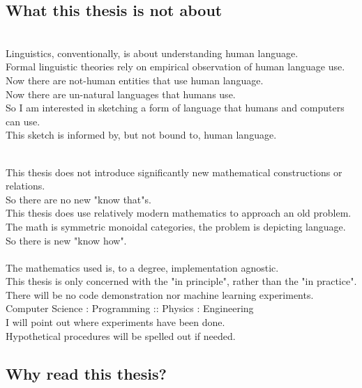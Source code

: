 \begin{fullwidth}
\begin{centering}
\subsection{What this thesis is not about}

\\
Linguistics, conventionally, is about understanding human language.\\
Formal linguistic theories rely on empirical observation of human language use.\\
Now there are not-human entities that use human language.\\
Now there are un-natural languages that humans use.\\
So I am interested in sketching a form of language that humans and computers can use.\\
This sketch is informed by, but not bound to, human language.

\\
This thesis does not introduce significantly new mathematical constructions or relations.\\
So there are no new "know that"s.\\
This thesis does use relatively modern mathematics to approach an old problem.\\
The math is symmetric monoidal categories, the problem is depicting language.
So there is new "know how".\\

\\
The mathematics used is, to a degree, implementation agnostic.\\
This thesis is only concerned with the "in principle", rather than the "in practice".\\
There will be no code demonstration nor machine learning experiments.\\
Computer Science : Programming :: Physics : Engineering\\
I will point out where experiments have been done.\\
Hypothetical procedures will be spelled out if needed.

\subsection{Why read this thesis?}


\end{centering}
\end{fullwidth}
